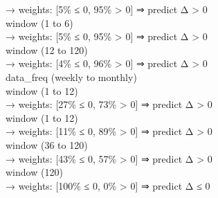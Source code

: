 \begin{flushleft}
\quad \quad \quad \quad → weights: [5\% ≤ 0, 95\% > 0] ⇒ predict Δ > 0 \\
\quad \quad \quad window (1 to 6) \\
\quad \quad \quad \quad → weights: [5\% ≤ 0, 95\% > 0] ⇒ predict Δ > 0 \\
\quad \quad \quad window (12 to 120) \\
\quad \quad \quad \quad → weights: [4\% ≤ 0, 96\% > 0] ⇒ predict Δ > 0 \\
\quad \quad data\_freq (weekly to monthly) \\
\quad \quad \quad window (1 to 12) \\
\quad \quad \quad \quad → weights: [27\% ≤ 0, 73\% > 0] ⇒ predict Δ > 0 \\
\quad \quad \quad window (1 to 12) \\
\quad \quad \quad \quad → weights: [11\% ≤ 0, 89\% > 0] ⇒ predict Δ > 0 \\
\quad \quad \quad window (36 to 120) \\
\quad \quad \quad \quad → weights: [43\% ≤ 0, 57\% > 0] ⇒ predict Δ > 0 \\
\quad window (120) \\
\quad \quad \quad \quad → weights: [100\% ≤ 0, 0\% > 0] ⇒ predict Δ ≤ 0 \\
\end{flushleft}
